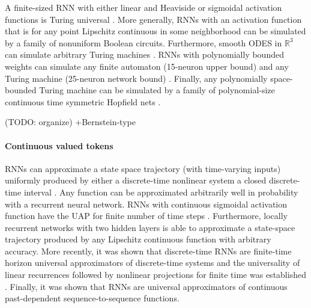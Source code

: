 \documentclass{article}
\newcommand{\ascomment}[1]{\textcolor{ascolor}{(#1)}}
\theoremstyle{definition} \newtheorem{definition}{Definition}
\theoremstyle{remark} \newtheorem{remark}{Remark}
\newcommand{\reals}{\mathbb{R}}
\newcounter{ct}
\begin{document}
A finite-sized RNN with either linear and Heaviside or sigmoidal activation functions is Turing universal \citep{pollack1991induction, siegelmann1992computational,kilian1996universality}.
More generally, RNNs with an activation function that is for any point Lipschitz continuous in some neighborhood can be simulated by a family of nonuniform Boolean circuits\citep{siegelmann1994analog}.
Furthermore, smooth ODES in $\reals^3$ can simulate arbitrary Turing machines \citep{branicky1995universal}. %
RNNs with polynomially bounded weights can simulate any finite automaton (15-neuron upper bound) and any Turing machine (25-neuron network bound) \citep{indyk1995optimal}.
Finally, any polynomially space-bounded Turing machine can be simulated by a family of polynomial-size continuous time symmetric Hopfield nets \citep{sima2003continuous}.

\ascomment{TODO: organize} 
\citep{moore1990unpredictability,moore1998finite}
\citep{cabessa2019turing}
\citep{perez2019turing}
\citep{chung2021turing}
\citep{perez2021attention}
\citep{giannou2023looped}
\citep{stogin2024provably}
 \citep{nowak2023representational, nowak2024representational}
+Bernstein-type \citep{veeravalli2023nonlinear}


\paragraph{Continuous valued tokens}
RNNs can approximate a state space trajectory (with time-varying inputs) uniformly  produced by either a discrete-time nonlinear system a closed discrete-time interval \citep{jin1995universal}.
Any function can be approximated arbitrarily well in probability with a recurrent neural network\citep{hammer2000approximation}.  %
RNNs with continuous sigmoidal activation function have the UAP for finite number of time steps \citep{schafer2006recurrent, schafer2007uap}.
Furthermore, locally recurrent networks with two hidden layers is able to approximate a state-space trajectory produced by any Lipschitz continuous function with arbitrary accuracy\citep{patan2008approximation}.
More recently, it was shown that discrete-time RNNs are finite-time horizon universal approximators of discrete-time systems \citep{aguiar2023universal} and the universality of linear recurrences followed by nonlinear projections for finite time was established \citep{orvieto2023universality}.
Finally, it was shown that RNNs are universal approximators of continuous past-dependent sequence-to-sequence functions\citep{song2023minimal}.%
\end{document}
